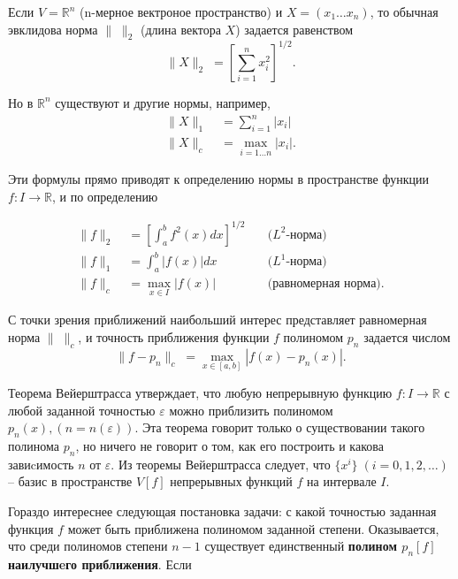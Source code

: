 Если $V = \mathbb{R}^n$ (n-мерное вектроное пространство) и $X=(x_1 \dots x_n)$, то обычная эвклидова норма $\parallel\;\parallel_2$ (длина вектора $X$) задается равенством
\begin{equation}
\parallel X\parallel_2 \; = \left[\sum_{i=1}^{n} x_i^2 \right]^{1/2}.
\end{equation}

Но в $\mathbb{R}^n$ существуют и другие нормы, например,
\begin{align}
\parallel X \parallel_1 \; &= \sum_{i = 1}^{n}|x_i| \\
\parallel X \parallel_c \; &= \max_{i = 1\dots n}|x_i|.
\end{align}

Эти формулы прямо приводят к определению нормы в пространстве функции $f: I \rightarrow \mathbb{R}$, и по определению


\begin{align}
\parallel f \parallel_2 \; &= \left[ \int_{a}^{b} f^2(x)dx \right]^{1/2} \quad &\text{($L^2$-норма)}\\
\parallel f \parallel_1 \; &= \int_{a}^{b} |f(x)|dx \quad &\text{($L^1$-норма)} \\
\parallel f \parallel_c \; &= \max_{x \in I}|f(x)| \quad &\text{(равномерная норма)}.
\end{align}


С точки зрения приближений наибольший интерес представляет равномерная норма $\parallel \; \parallel_c	$, и точность приближения функции $f$ полиномом $p_n$ задается числом 
\begin{equation}
\parallel f - p_n \parallel_c \; = \max_{x\in [a, b]} |f(x)-p_n(x)|.
\end{equation}


Теорема Вейерштрасса утверждает, что любую непрерывную функцию $f: I \rightarrow \mathbb{R}$  с любой заданной точностью $\varepsilon$ можно приблизить полиномом $p_n(x), (n = n(\varepsilon))$. 
Эта теорема говорит только о существовании такого полинома $p_n$, но ничего не говорит о том, как его построить и какова завиcимость $n$ от $\varepsilon$. 
Из теоремы Вейерштрасса следует, что $\{x^i\} \; (i = 0, 1, 2, \dots )$ -- базис в пространстве $V[f]$ непрерывных функций $f$ на интервале $I$.

Гораздо интереснее следующая постановка задачи: с какой точностью заданная функция $f$ может быть приближена полиномом заданной степени. 
Оказывается, что среди полиномов степени $n - 1$ существует единственный \textbf{полином $p_n[f]$ наилучшeго приближения}. Если

